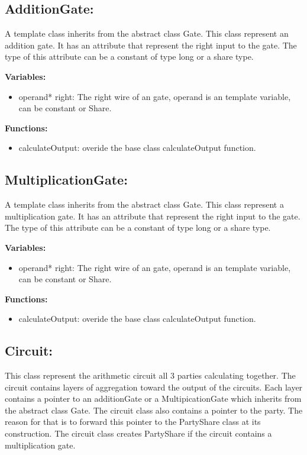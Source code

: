 \documentclass[12pt]{article}
\begin{document}
\subsection{AdditionGate:}
A template class inherits from the abstract class Gate. This class represent an addition gate. It has an attribute that represent the right input to the gate. The type of this attribute can be a constant of type long or a share type.\hfill\break

\textbf{Variables:}
\begin{itemize}
\item operand* right: The right wire of an gate, operand is an template variable, can be constant or Share.
\end{itemize}
\textbf{Functions:}
\begin{itemize}
	\item calculateOutput: overide the base class calculateOutput function.
\end{itemize}
\subsection{MultiplicationGate:}
A template class inherits from the abstract class Gate. This class represent a multiplication gate. It has an attribute that represent the right input to the gate. The type of this attribute can be a constant of type long or a share type.\hfill\break

\textbf{Variables:}
\begin{itemize}
\item operand* right: The right wire of an gate, operand is an template variable, can be constant or Share.
\end{itemize}
\textbf{Functions:}
\begin{itemize}
	\item calculateOutput: overide the base class calculateOutput function.
\end{itemize}
\subsection{Circuit:}
This class represent the arithmetic circuit all 3 parties calculating together. The circuit contains layers of aggregation toward the output of the circuits. Each layer contains a pointer to an additionGate or a MultipicationGate which inherits from the abstract class Gate.
The circuit class also contains a pointer to the party. The reason for that is to forward this pointer to the PartyShare class at its construction. The circuit class creates PartyShare if the circuit contains a multiplication gate.
\hfill\break
\end{document}
